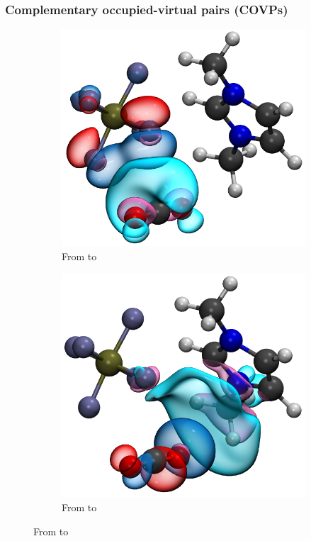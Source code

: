 \documentclass[xcolor=usenames,dvipsnames,svgnames]{beamer}
\begin{document}
\begin{frame}
  \frametitle{Complementary occupied-virtual pairs (COVPs)}
  \centering
  \begin{figure}
    \begin{subfigure}[b]{0.50\linewidth}
      \includegraphics[width=\linewidth,keepaspectratio,natwidth=601,natheight=535]{./figures/PF6.to_CO2.1.png}
      \caption*{From \ce{[PF6]-} to }
    \end{subfigure}%
    \begin{subfigure}[b]{0.50\linewidth}
      \includegraphics[width=\linewidth,keepaspectratio,natwidth=586,natheight=538]{./figures/PF6.from_CO2.1.png}
      \caption*{From  to \ce{[C1C1im]+}}
    \end{subfigure}
  \end{figure}
\end{frame}
\end{document}
